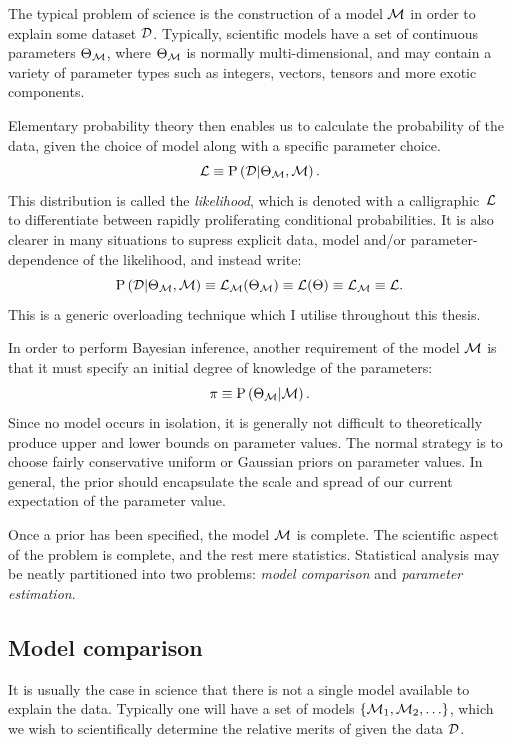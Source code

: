 The typical problem of science is the construction of a model $\mathcal{M}$ in order to explain some dataset $\mathcal{D}$. Typically, scientific models have a set of continuous parameters $\Theta_{\mathcal{M}}$, where $\Theta_{\mathcal{M}}$ is normally multi-dimensional, and may contain a variety of parameter types such as integers, vectors, tensors and more exotic components.

Elementary probability theory then enables us to calculate the probability of the data, given the choice of model along with a specific parameter choice.
\begin{equation}
  \mathcal{L}\equiv\mathrm{P}\left(\mathcal{D}\middle|\Theta_{\mathcal{M}},\mathcal{M}\right).
  \label{eqn:bay:lik_def}
\end{equation}
This distribution is called the {\em likelihood}, which is denoted with a calligraphic~$\mathcal{L}$ to differentiate between rapidly proliferating conditional probabilities. It is also clearer in many situations to supress explicit data, model and/or parameter-dependence of the likelihood, and instead write:
\begin{equation}
  \mathrm{P}\left(\mathcal{D}\middle|\Theta_{\mathcal{M}},\mathcal{M}\right)
  \equiv
  \mathcal{L}_{\mathcal{M}}(\Theta_{\mathcal{M}})
  \equiv
  \mathcal{L}(\Theta)
  \equiv
  \mathcal{L}_{\mathcal{M}}
  \equiv
  \mathcal{L}.\nonumber
\end{equation}
This is a generic overloading technique which I utilise throughout this thesis.

In order to perform Bayesian inference, another requirement of the model $\mathcal{M}$ is that it must specify an initial degree of knowledge of the parameters:
\begin{equation}
  \pi\equiv\mathrm{P}\left(\Theta_{\mathcal{M}}\middle|\mathcal{M}\right).
  \label{eqn:bay:prior_def}
\end{equation}
Since no model occurs in isolation, it is generally not difficult to theoretically produce upper and lower bounds on parameter values. The normal strategy is to choose fairly conservative uniform or Gaussian priors on parameter values. In general, the prior should encapsulate the scale and spread of our current expectation of the parameter value.

Once a prior has been specified, the model $\mathcal{M}$ is complete. The scientific aspect of the problem is complete, and the rest mere statistics. Statistical analysis may be neatly partitioned into two problems: {\em model comparison\/} and {\em parameter estimation}.

\subsection{Model comparison}
It is usually the case in science that there is not a single model available to explain the data. Typically one will have a set of models ${\{\mathcal{M}_1,\mathcal{M}_2,\ldots\}}$, which we wish to scientifically determine the relative merits of given the data $\mathcal{D}$.

